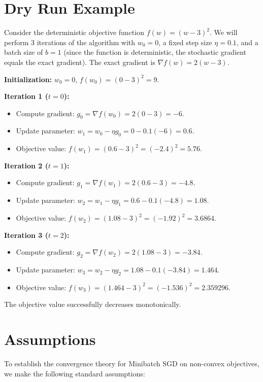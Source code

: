 \documentclass{article}
\begin{document}
\section*{Dry Run Example}
Consider the deterministic objective function $f(w) = (w-3)^2$. We will perform 3 iterations of the algorithm with $w_0 = 0$, a fixed step size $\eta = 0.1$, and a batch size of $b=1$ (since the function is deterministic, the stochastic gradient equals the exact gradient). The exact gradient is $\nabla f(w) = 2(w-3)$.

\textbf{Initialization:} $w_0 = 0$, $f(w_0) = (0-3)^2 = 9$.

\textbf{Iteration 1 ($t=0$):}
\begin{itemize}
    \item Compute gradient: $g_0 = \nabla f(w_0) = 2(0-3) = -6$.
    \item Update parameter: $w_1 = w_0 - \eta g_0 = 0 - 0.1(-6) = 0.6$.
    \item Objective value: $f(w_1) = (0.6-3)^2 = (-2.4)^2 = 5.76$.
\end{itemize}

\textbf{Iteration 2 ($t=1$):}
\begin{itemize}
    \item Compute gradient: $g_1 = \nabla f(w_1) = 2(0.6-3) = -4.8$.
    \item Update parameter: $w_2 = w_1 - \eta g_1 = 0.6 - 0.1(-4.8) = 1.08$.
    \item Objective value: $f(w_2) = (1.08-3)^2 = (-1.92)^2 = 3.6864$.
\end{itemize}

\textbf{Iteration 3 ($t=2$):}
\begin{itemize}
    \item Compute gradient: $g_2 = \nabla f(w_2) = 2(1.08-3) = -3.84$.
    \item Update parameter: $w_3 = w_2 - \eta g_2 = 1.08 - 0.1(-3.84) = 1.464$.
    \item Objective value: $f(w_3) = (1.464-3)^2 = (-1.536)^2 = 2.359296$.
\end{itemize}
The objective value successfully decreases monotonically.

\vspace{1cm}

\section*{Assumptions}
To establish the convergence theory for Minibatch SGD on non-convex objectives, we make the following standard assumptions:
\end{document}
